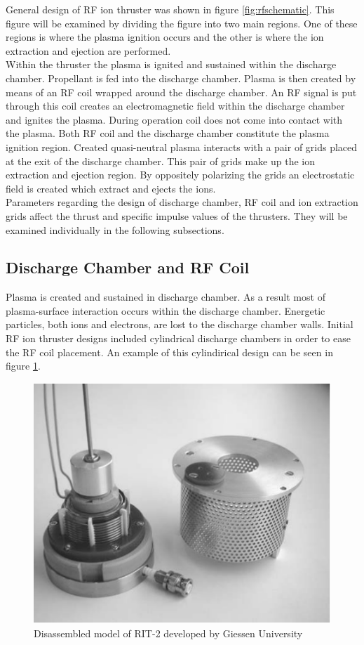 General design of RF ion thruster was shown in figure \ref{fig:rfschematic}. This figure will be examined by dividing the figure into two main regions. One of these regions is where the plasma ignition occurs and the other is where the ion extraction and ejection are performed. \\
Within the thruster the plasma is ignited and sustained within the discharge chamber.  Propellant is fed into the discharge chamber. Plasma is then created by means of an RF coil wrapped around the discharge chamber. An RF signal is put through this coil creates an electromagnetic field within the discharge chamber and ignites the plasma. During operation coil does not come into contact with the plasma. Both RF coil and the discharge chamber constitute the plasma ignition region.
Created quasi-neutral plasma interacts with a pair of grids placed at the exit of the discharge chamber. This pair of grids make up the ion extraction and ejection region. By oppositely polarizing the grids an electrostatic field is created which extract and ejects the ions. \\
Parameters regarding the design of discharge chamber, RF coil and ion extraction grids affect the thrust and specific impulse values of the thrusters. They will be examined individually in the following subsections. 
\subsection{Discharge Chamber and RF Coil}

Plasma is created and sustained in discharge chamber. As a result most of plasma-surface interaction occurs within the discharge chamber. Energetic particles, both ions and electrons, are
lost to the discharge chamber walls. Initial RF ion thruster designs included cylindrical discharge chambers in order to ease the RF coil placement. An example of this cylindirical design can be seen in figure \ref{fig:RIT2}. 
\newpage
\begin{figure}[ht]
    \centering
    \includegraphics[scale=0.8]{fig/RIT2.png}
    \caption[Disassembled model of RIT-2 developed by Giessen University]{Disassembled model of RIT-2 developed by Giessen University\cite{loeb2004development}}
    \label{fig:RIT2}
\end{figure}

